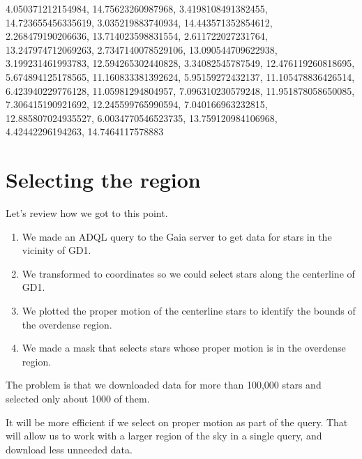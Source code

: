 \documentclass[letterpaper,10pt,english]{sphinxmanual}
\begin{document}
\begin{sphinxVerbatim}[commandchars=\\\{\}]
\PYGZsq{}\PYGZhy{}4.050371212154984, \PYGZhy{}14.75623260987968, \PYGZhy{}3.4198108491382455, \PYGZhy{}14.723655456335619, \PYGZhy{}3.035219883740934, \PYGZhy{}14.443571352854612, \PYGZhy{}2.268479190206636, \PYGZhy{}13.714023598831554, \PYGZhy{}2.611722027231764, \PYGZhy{}13.247974712069263, \PYGZhy{}2.7347140078529106, \PYGZhy{}13.090544709622938, \PYGZhy{}3.199231461993783, \PYGZhy{}12.594265302440828, \PYGZhy{}3.34082545787549, \PYGZhy{}12.476119260818695, \PYGZhy{}5.674894125178565, \PYGZhy{}11.160833381392624, \PYGZhy{}5.95159272432137, \PYGZhy{}11.105478836426514, \PYGZhy{}6.423940229776128, \PYGZhy{}11.05981294804957, \PYGZhy{}7.096310230579248, \PYGZhy{}11.951878058650085, \PYGZhy{}7.306415190921692, \PYGZhy{}12.245599765990594, \PYGZhy{}7.040166963232815, \PYGZhy{}12.885807024935527, \PYGZhy{}6.0034770546523735, \PYGZhy{}13.759120984106968, \PYGZhy{}4.42442296194263, \PYGZhy{}14.7464117578883\PYGZsq{}
\end{sphinxVerbatim}


\section{Selecting the region}
\label{\detokenize{04_select:selecting-the-region}}
Let’s review how we got to this point.
\begin{enumerate}
%
\item {} 
We made an ADQL query to the Gaia server to get data for stars in the vicinity of GD\sphinxhyphen{}1.

\item {} 
We transformed to  coordinates so we could select stars along the centerline of GD\sphinxhyphen{}1.

\item {} 
We plotted the proper motion of the centerline stars to identify the bounds of the overdense region.

\item {} 
We made a mask that selects stars whose proper motion is in the overdense region.

\end{enumerate}

The problem is that we downloaded data for more than 100,000 stars and selected only about 1000 of them.

It will be more efficient if we select on proper motion as part of the query.  That will allow us to work with a larger region of the sky in a single query, and download less unneeded data.
\end{document}
